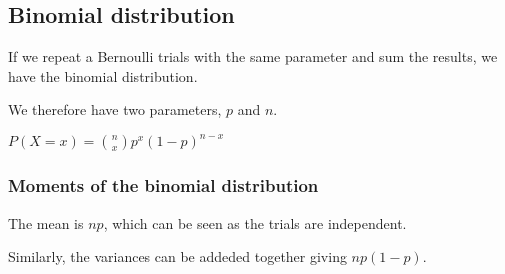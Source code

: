 
\subsection{Binomial distribution}

If we repeat a Bernoulli trials with the same parameter and sum the results, we have the binomial distribution.

We therefore have two parameters, \(p\) and \(n\).

\(P(X=x)={n\choose x }p^x(1-p)^{n-x}\)

\subsubsection{Moments of the binomial distribution}

The mean is \(np\), which can be seen as the trials are independent.

Similarly, the variances can be addeded together giving \(np(1-p)\).

